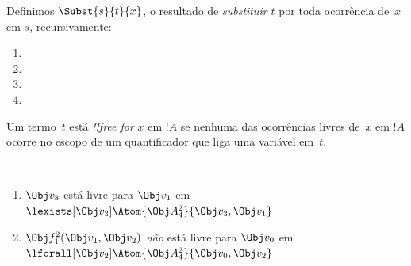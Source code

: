 \documentclass[../../../include/open-logic-section]{subfiles}
\begin{document}


\begin{defn}
Definimos $\Subst{s}{t}{x}$, o resultado de \emph{substituir} $t$
por toda ocorrência de~$x$ em $s$, recursivamente:
\begin{enumerate}
\item {}

\item {}

\item {}

\item{}
\end{enumerate}
\end{defn}

\begin{defn}
Um termo~$t$ está \emph{!!{free for}} $x$ em $!A$ se nenhuma das
ocorrências livres de~$x$ em $!A$ ocorre no escopo de um quantificador que
liga uma variável em~$t$.
\end{defn}

\begin{ex} ~
\begin{enumerate}
\item $\Obj v_8$ está livre para $\Obj v_1$ em $\lexists[\Obj
  v_3]\Atom{\Obj A^2_4}{\Obj v_3,\Obj v_1}$

\item $\Obj f^2_1(\Obj v_1, \Obj v_2)$ \emph{não} está livre para $\Obj
  v_0$ em $\lforall[\Obj v_2]\Atom{\Obj A^2_4}{\Obj v_0,\Obj v_2}$
\end{enumerate}
\end{ex}
\end{document}
